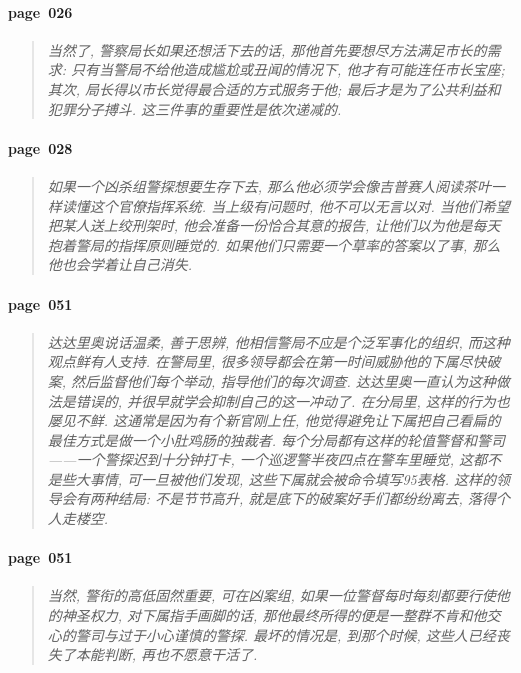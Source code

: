 \paragraph*{page~026}
\begin{quotation}
    \itshape
    当然了, 警察局长如果还想活下去的话, 那他首先要想尽方法满足市长的需求: 只有当警局不给他造成尴尬或丑闻的情况下, 他才有可能连任市长宝座; 其次, 局长得以市长觉得最合适的方式服务于他; 最后才是为了公共利益和犯罪分子搏斗. 这三件事的重要性是依次递减的. 
\end{quotation}

\paragraph*{page~028}
\begin{quotation}
    \itshape
    如果一个凶杀组警探想要生存下去, 那么他必须学会像吉普赛人阅读茶叶一样读懂这个官僚指挥系统. 当上级有问题时, 他不可以无言以对. 当他们希望把某人送上绞刑架时, 他会准备一份恰合其意的报告, 让他们以为他是每天抱着警局的指挥原则睡觉的. 如果他们只需要一个草率的答案以了事, 那么他也会学着让自己消失.
\end{quotation}

\paragraph*{page~051}
\begin{quotation}
    \itshape
    达达里奥说话温柔, 善于思辨, 他相信警局不应是个泛军事化的组织, 而这种观点鲜有人支持. 在警局里, 很多领导都会在第一时间威胁他的下属尽快破案, 然后监督他们每个举动, 指导他们的每次调查. 达达里奥一直认为这种做法是错误的, 并很早就学会抑制自己的这一冲动了. 在分局里, 这样的行为也屡见不鲜. 这通常是因为有个新官刚上任, 他觉得避免让下属把自己看扁的最佳方式是做一个小肚鸡肠的独裁者. 每个分局都有这样的轮值警督和警司------一个警探迟到十分钟打卡, 一个巡逻警半夜四点在警车里睡觉, 这都不是些大事情, 可一旦被他们发现, 这些下属就会被命令填写95表格. 这样的领导会有两种结局: 不是节节高升, 就是底下的破案好手们都纷纷离去, 落得个人走楼空.
\end{quotation}

\paragraph*{page~051}
\begin{quotation}
    \itshape
    当然, 警衔的高低固然重要, 可在凶案组, 如果一位警督每时每刻都要行使他的神圣权力, 对下属指手画脚的话, 那他最终所得的便是一整群不肯和他交心的警司与过于小心谨慎的警探. 最坏的情况是, 到那个时候, 这些人已经丧失了本能判断, 再也不愿意干活了.
\end{quotation}

